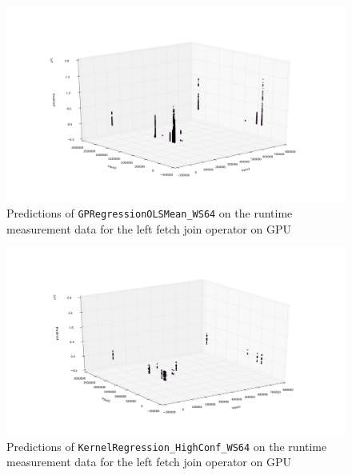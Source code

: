 \begin{figure}[htbp]
  \centering
    \includegraphics[width=\linewidth]{./Figures/gpreg_olsmean_ws64_ocl_leftfetchjoin_on_gpu}
  \caption{Predictions of \texttt{GPRegressionOLSMean\_WS64} on the runtime measurement data for the left fetch join operator on GPU}
  \label{gpreg_olsmean_ws64_ocl_leftfetchjoin_on_gpu}
\end{figure}

\begin{figure}[htbp]
  \centering
    \includegraphics[width=\linewidth]{./Figures/kreg_ws64_ocl_leftfetchjoin_on_gpu.pdf}
  \caption{Predictions of \texttt{KernelRegression\_HighConf\_WS64} on the runtime measurement data for the left fetch join operator on GPU}
  \label{kreg_ws64_ocl_leftfetchjoin_on_gpu}
\end{figure}


